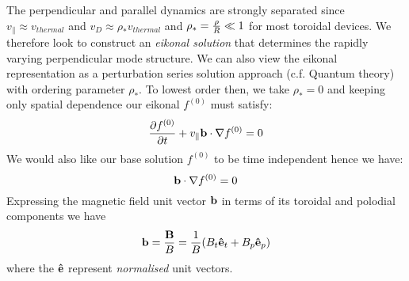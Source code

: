 \documentclass[a4paper,11pt]{article}
\begin{document}

The perpendicular and parallel dynamics are strongly separated since $v_\parallel \approx v_{thermal}$ and $v_D \approx \rho_* v_{thermal}$ and $\rho_* = {\rho \over R} \ll 1$ for most toroidal devices.  We therefore look to construct an \textit{eikonal solution} that determines the rapidly varying perpendicular mode structure.  We can also view the eikonal representation as a perturbation series solution approach (c.f. Quantum theory) with ordering parameter $\rho_*$.
To lowest order then, we take $\rho_* = 0$ and keeping only spatial dependence our eikonal $f^{(0)}$ must satisfy:
\begin{equation}
{\partial f^{(0)} \over \partial t} + v_\parallel {\bf b}\cdot \nabla f^{(0)} = 0
\end{equation}
We would also like our base solution $f^{(0)}$ to be time independent hence we have:
\begin{equation}
{\bf b}\cdot \nabla f^{(0)}  = 0
\label{eq.mag}
\end{equation}
Expressing the magnetic field unit vector ${\bf b}$ in terms of its toroidal and polodial components we have
\begin{equation}
 {\bf b}= {{\bf B} \over B} = {1 \over B} (B_t {\bf {\hat e}}_t + B_p {\bf {\hat e}}_p)
\end{equation}
where the ${\bf {\hat e}}$ represent \textit{normalised} unit vectors.  
\end{document}
